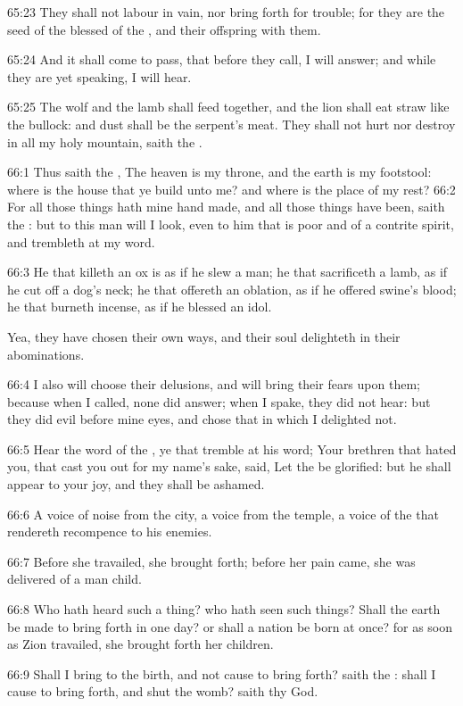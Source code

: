 65:23 They shall not labour in vain, nor bring forth for trouble; for
they are the seed of the blessed of the \LORD, and their offspring with
them.

65:24 And it shall come to pass, that before they call, I will answer;
and while they are yet speaking, I will hear.

65:25 The wolf and the lamb shall feed together, and the lion shall
eat straw like the bullock: and dust shall be the serpent's meat. They
shall not hurt nor destroy in all my holy mountain, saith the \LORD.

66:1 Thus saith the \LORD, The heaven is my throne, and the earth is my
footstool: where is the house that ye build unto me? and where is the
place of my rest?  66:2 For all those things hath mine hand made, and
all those things have been, saith the \LORD: but to this man will I
look, even to him that is poor and of a contrite spirit, and trembleth
at my word.

66:3 He that killeth an ox is as if he slew a man; he that sacrificeth
a lamb, as if he cut off a dog's neck; he that offereth an oblation,
as if he offered swine's blood; he that burneth incense, as if he
blessed an idol.

Yea, they have chosen their own ways, and their soul delighteth in
their abominations.

66:4 I also will choose their delusions, and will bring their fears
upon them; because when I called, none did answer; when I spake, they
did not hear: but they did evil before mine eyes, and chose that in
which I delighted not.

66:5 Hear the word of the \LORD, ye that tremble at his word; Your
brethren that hated you, that cast you out for my name's sake, said,
Let the \LORD be glorified: but he shall appear to your joy, and they
shall be ashamed.

66:6 A voice of noise from the city, a voice from the temple, a voice
of the \LORD that rendereth recompence to his enemies.

66:7 Before she travailed, she brought forth; before her pain came,
she was delivered of a man child.

66:8 Who hath heard such a thing? who hath seen such things? Shall the
earth be made to bring forth in one day? or shall a nation be born at
once?  for as soon as Zion travailed, she brought forth her children.

66:9 Shall I bring to the birth, and not cause to bring forth? saith
the \LORD: shall I cause to bring forth, and shut the womb? saith thy
God.

